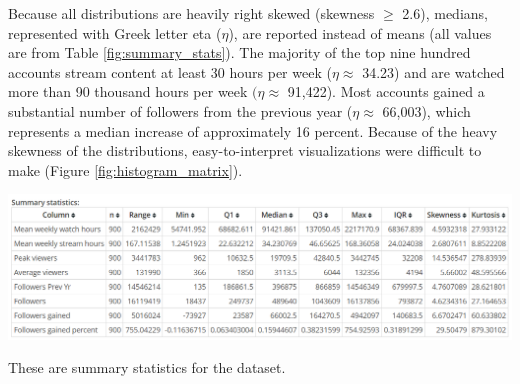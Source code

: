 \documentclass[12pt]{article}
\begin{document}
Because all distributions are heavily right skewed (skewness $\geq$ 2.6), medians, represented with Greek letter eta ($\eta$), are reported instead of means (all values are from Table \ref{fig:summary_stats}). The majority of the top nine hundred accounts stream content at least 30 hours per week ($\eta \approx$ 34.23) and are watched more than 90 thousand hours per week $(\eta \approx$ 91,422). Most accounts gained a substantial number of followers from the previous year ($\eta \approx$ 66,003), which represents a median increase of approximately 16 percent. Because of the heavy skewness of the distributions, easy-to-interpret visualizations were difficult to make (Figure \ref{fig:histogram_matrix}).



\begin{table}[t]
  \centering
  \includegraphics[width=\linewidth]{../StatCrunch_Results/reciprocal/table}
  \captionsetup{justification=centering, singlelinecheck=false, margin=2cm}
  \caption[Summary Statistics]{These are summary statistics for the dataset.}
  \label{fig:summary_stats}
\end{table}
\end{document}
